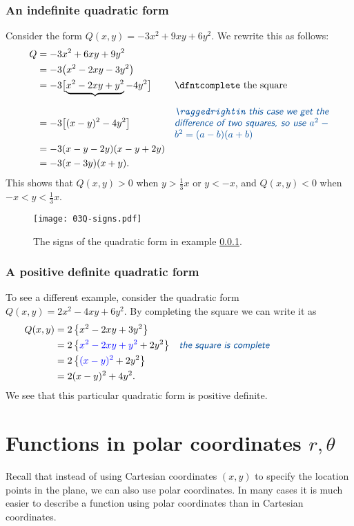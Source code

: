 \subsubsection{An indefinite quadratic form} 
\label{sec:quad-form-example-indefinite}
Consider the form $Q(x, y) = -3x^2+9xy+6y^2$. We rewrite this as
follows:
\begin{align*}
  Q&= -3x^2+6xy+9y^2\\
  &=-3\bigl(x^2 - 2xy -3y^2\bigr) \\
  &= -3\bigl[\underbrace{x^2  - 2xy + y^2}_{} -4 y^2\bigr]
  & \parbox{160pt}{\dfnt%
  complete the square}\\
  &= -3\bigl[(x-y)^2 - 4y^2\bigr]
  & \parbox{160pt}{\dfnt\raggedright%
   in this case we get the difference of two squares,
   so use $a^2-b^2 = (a-b)(a+b)$}\\
  &= -3(x-y-2y)(x-y+2y) \\
  &= -3(x-3y)(x+y).
\end{align*}
This shows that $Q(x, y) > 0$ when $y>\tfrac 13 x$ or $y<-x$,
and $Q(x, y) <0$ when $-x < y < \tfrac 13x$.

\begin{figure}[h]
\texttt{[image: 03Q-signs.pdf]}
\caption{The signs of the quadratic form in example
  \ref{sec:quad-form-example-indefinite}.}
\end{figure}

\subsubsection{A positive definite quadratic form}
\label{sec:quad-form-example-positive-definite}
To see a different example, consider the quadratic form $Q(x, y) = 2x^2-4xy+6y^2$.
By completing the square we can write it as
\begin{align*}
  Q(x, y)
  &= 2\, \bigl\{x^2 -2xy + 3y^2\bigr\} & \\
  &= 2\, \bigl\{\color{blue}x^2-2xy+y^2\color{black} + 2y^2\bigr\}
  &\parbox{160pt}{\dfnt the square is complete}\\
  &= 2\, \bigl\{\color{blue}(x-y)^2\color{black} + 2y^2\bigr\} &\\
  &= 2(x-y)^2 + 4y^2.
\end{align*}
We see that this particular quadratic form is positive definite.


\section{Functions in polar coordinates $r,\theta$} 
\label{sec:functions-in-PC}%
Recall that instead of using Cartesian coordinates $(x,y)$ to specify the location
points in the plane, we can also use polar coordinates.  In many cases it is much
easier to describe a function using polar coordinates than in Cartesian coordinates.

